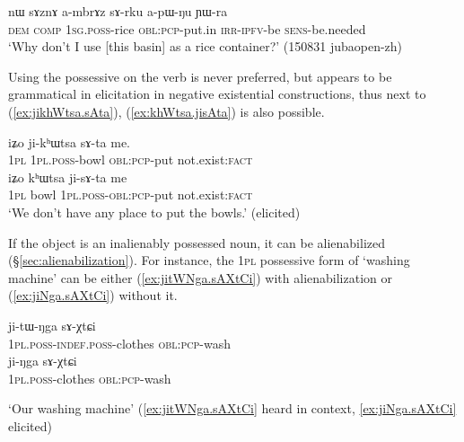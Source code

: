 \begin{exe}
\ex \label{ex:ambrAz.sArku}
\gll  nɯ sɤznɤ a-mbrɤz sɤ-rku a-pɯ-ŋu ɲɯ-ra \\
\textsc{dem} \textsc{comp} \textsc{1sg}.\textsc{poss}-rice \textsc{obl}:\textsc{pcp}-put.in \textsc{irr}-\textsc{ipfv}-be \textsc{sens}-be.needed \\
\glt  `Why don't I use [this basin] as a rice container?' (150831 jubaopen-zh)
\end{exe} 

Using the possessive on the verb is never preferred, but appears to be grammatical in elicitation in negative existential constructions, thus next to (\ref{ex:jikhWtsa.sAta}),  (\ref{ex:khWtsa.jisAta}) is also possible.
\begin{exe}
\ex
\begin{xlist}
\ex \label{ex:jikhWtsa.sAta}
\gll iʑo ji-kʰɯtsa sɤ-ta me. \\
\textsc{1pl} \textsc{1pl}.\textsc{poss}-bowl  \textsc{obl}:\textsc{pcp}-put not.exist:\textsc{fact} \\ 
\ex \label{ex:khWtsa.jisAta}
\gll iʑo kʰɯtsa ji-sɤ-ta me  \\
\textsc{1pl} bowl \textsc{1pl}.\textsc{poss}-\textsc{obl}:\textsc{pcp}-put not.exist:\textsc{fact} \\ 
\glt `We  don't have any place to put the bowls.' (elicited)
\end{xlist}
\end{exe} 


If the object is an inalienably possessed noun, it can be alienabilized (§\ref{sec:alienabilization}). For instance, the \textsc{1pl} possessive form of  `washing machine' can be either (\ref{ex:jitWNga.sAXtCi}) with alienabilization or (\ref{ex:jiNga.sAXtCi}) without it.

\begin{exe}
\ex
\begin{xlist}
\ex \label{ex:jitWNga.sAXtCi}
\gll ji-tɯ-ŋga sɤ-χtɕi \\
\textsc{1pl}.\textsc{poss}-\textsc{indef}.\textsc{poss}-clothes \textsc{obl}:\textsc{pcp}-wash \\
\ex \label{ex:jiNga.sAXtCi}
\gll ji-ŋga sɤ-χtɕi \\
\textsc{1pl}.\textsc{poss}-clothes \textsc{obl}:\textsc{pcp}-wash \\
\end{xlist}
\glt `Our washing machine' (\ref{ex:jitWNga.sAXtCi} heard in context, \ref{ex:jiNga.sAXtCi} elicited)
\end{exe}

